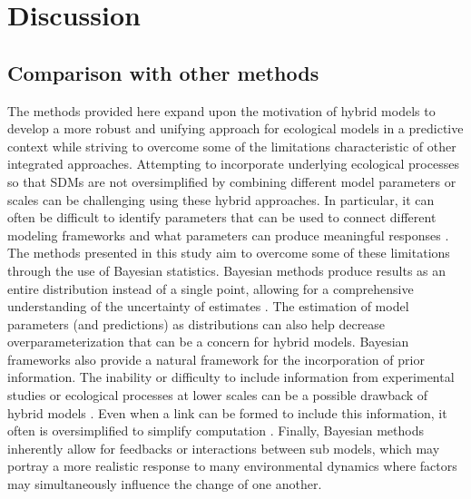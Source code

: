 \section*{Discussion}


\subsection*{Comparison with other methods}
The methods provided here expand upon the motivation of hybrid models to develop a more robust and unifying approach for ecological models in a predictive context while striving to overcome some of the limitations characteristic of other integrated approaches. 
Attempting to incorporate underlying ecological processes so that SDMs are not oversimplified by combining different model parameters or scales can be challenging using these hybrid approaches. 
In particular, it can often be difficult to identify parameters that can be used to connect different modeling frameworks and what parameters can produce meaningful responses \citep{Thuiller2013}. 
The methods presented in this study aim to overcome some of these limitations through the use of Bayesian statistics. 
Bayesian methods produce results as an entire distribution instead of a single point, allowing for a comprehensive understanding of the uncertainty of estimates \citep{Link2010}. 
The estimation of model parameters (and predictions) as distributions can also help decrease overparameterization that can be a concern for hybrid models. 
Bayesian frameworks also provide a natural framework for the incorporation of prior information. 
The inability or difficulty to include information from experimental studies or ecological processes at lower scales can be a possible drawback of hybrid models \citep{Thuiller2008, Smolik2010}. 
Even when a link can be formed to include this information, it often is oversimplified to simplify computation \citep{Gallien2010}. 
Finally, Bayesian methods inherently allow for feedbacks or interactions between sub models, which may portray a more realistic response to many environmental dynamics where factors may simultaneously influence the change of one another.

